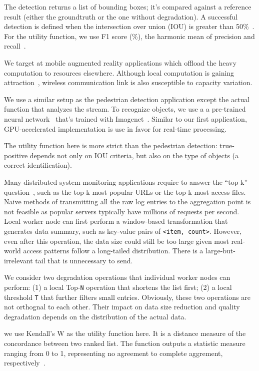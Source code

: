 The detection returns a list of bounding boxes; it's compared against a
reference result (either the groundtruth or the one without degradation). A
successful detection is defined when the intersection over union (IOU) is
greater than 50\%~\cite{everingham2010pascal}. For the utility function, we use
F1 score (\%), the harmonic mean of precision and
recall~\cite{Rijsbergen:1979:IR:539927}.

 We target at mobile augmented reality applications
which offload the heavy computation to resources elsewhere. Although local
computation is gaining attraction~\cite{satyanarayanan2009case, zhang2015cloud},
wireless communication link is also susceptible to capacity variation.

We use a similar setup as the pedestrian detection application except the actual
function that analyzes the stream. To recognize objects, we use a a pre-trained
neural network~\cite{darknet13} that's trained with
Imagenet~\cite{krizhevsky2012imagenet}. Similar to our first application,
GPU-accelerated implementation is use in favor for real-time processing.

The utility function here is more strict than the pedestrian detection:
true-positive depends not only on IOU criteria, but also on the type of objects
(a correct identification).

 Many distributed system monitoring applications
require to answer the ``top-k'' question~\cite{babcock2003distributed}, such as
the top-k most popular URLs or the top-k most access files. Naive methods of
transmitting all the raw log entries to the aggregation point is not feasible as
popular servers typically have millions of requests per second. Local worker
node can first perform a window-based transformation that generates data
summary, such as key-value pairs of \texttt{<item, count>}. However, even after
this operation, the data size could still be too large given most real-world
access patterns follow a long-tailed distribution. There is a
large-but-irrelevant tail that is unnecessary to send.

We consider two degradation operations that individual worker nodes can perform:
(1) a local Top-\texttt{N} operation that shortens the list first; (2) a local
threshold \texttt{T} that further filters small entries. Obviously, these two
operations are not orthognal to each other. Their impact on data size reduction
and quality degradation depends on the distribution of the actual data.

we use Kendall's W as the utility function here. It is a distance measure of the
concordance between two ranked list. The function outputs a statistic measure
ranging from 0 to 1, representing no agreement to complete aggrement,
respectively~\cite{abdi2007kendall}.


